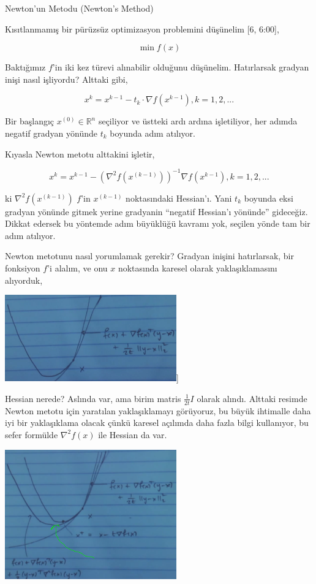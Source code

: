 \documentclass[12pt,fleqn]{article}\usepackage{../../common}
\begin{document}
Newton'un Metodu (Newton's Method)

Kısıtlanmamış bir pürüzsüz optimizasyon problemini düşünelim [6, 6:00], 

$$
\min f(x)
$$

Baktığımız $f$'in iki kez türevi alınabilir olduğunu düşünelim. Hatırlarsak
gradyan inişi nasıl işliyordu? Alttaki gibi,

$$
x^{k} = x^{k-1} - t_k \cdot \nabla f(x^{k-1}), k=1,2,...
$$

Bir başlangıç $x^{(0)} \in \mathbb{R}^n$ seçiliyor ve üstteki ardı ardına
işletiliyor, her adımda negatif gradyan yönünde $t_k$ boyunda adım
atılıyor.

Kıyasla Newton metotu alttakini işletir,

$$
x^{k} = x^{k-1} - 
\left( \nabla^2 f(x^{(k-1)}) \right)^{-1} \nabla f(x^{k-1}), k=1,2,...
$$

ki $\nabla^2 f(x^{(k-1)})$ $f$'in $x^{(k-1)}$ noktasındaki Hessian'ı. Yani
$t_k$ boyunda eksi gradyan yönünde gitmek yerine gradyanin ``negatif
Hessian'ı yönünde'' gideceğiz. Dikkat edersek bu yöntemde adım büyüklüğü
kavramı yok, seçilen yönde tam bir adım atılıyor.

Newton metotunu nasıl yorumlamak gerekir? Gradyan inişini hatırlarsak, bir
fonksiyon $f$'i alalım, ve onu $x$ noktasında karesel olarak
yaklaşıklamasını alıyorduk,

\includegraphics[width=20em]{func_35_newton_01.png}]

Hessian nerede? Aslında var, ama birim matris $\frac{1}{2t} I$ olarak
alındı. Alttaki resimde Newton metotu için yaratılan yaklaşıklamayı
görüyoruz, bu büyük ihtimalle daha iyi bir yaklaşıklama olacak çünkü
karesel açılımda daha fazla bilgi kullanıyor, bu sefer formülde $\nabla^2
f(x)$ ile Hessian da var. 

\includegraphics[width=20em]{func_35_newton_02.png}
\end{document}
